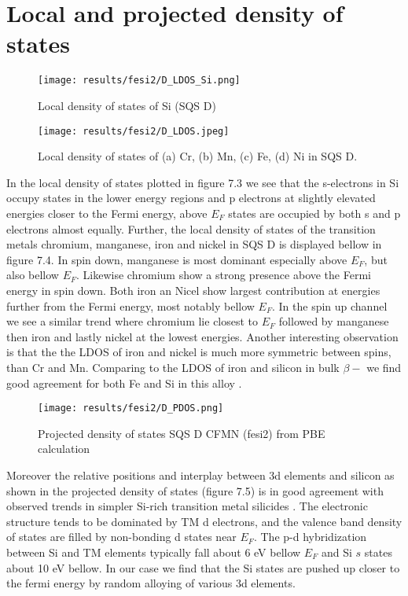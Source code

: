 \section{Local and projected density of states}
  
\begin{figure}[H]
	\centering
	\texttt{[image: results/fesi2/D\_LDOS\_Si.png]}
	\caption{Local density of states of Si (SQS D)}
\end{figure} 

\begin{figure}[H]
	\centering
	\texttt{[image: results/fesi2/D\_LDOS.jpeg]}
	\caption{Local density of states of (a) Cr, (b) Mn, (c) Fe, (d) Ni in SQS D.}
\end{figure}   
  
In the local density of states plotted in figure 7.3 we see that the s-electrons in Si occupy states in the lower energy regions and p electrons at slightly elevated energies closer to the Fermi energy, above $E_F$ states are occupied by both s and p electrons almost equally. Further, the local density of states of the transition metals chromium, manganese, iron and nickel in SQS D is displayed bellow in figure 7.4. In spin down, manganese is most dominant especially above $E_F$, but also bellow $E_F$. Likewise chromium show a strong presence above the Fermi energy in spin down. Both iron an Nicel show largest contribution at energies further from the Fermi energy, most notably bellow $E_F$. In the spin up channel we see a similar trend where chromium lie closest to $E_F$ followed by manganese then iron and lastly nickel at the lowest energies. Another interesting observation is that the the LDOS of iron and nickel is much more symmetric between spins, than Cr and Mn. Comparing to the LDOS of iron and silicon in bulk $\beta-$  \cite{doi:10.1063/1.346415} we find good agreement for both Fe and Si in this alloy .

\begin{figure}[H]
	\centering
	\texttt{[image: results/fesi2/D\_PDOS.png]}
	\caption{Projected density of states SQS D CFMN (fesi2) from PBE calculation}
\end{figure} 

Moreover the relative positions and interplay between 3d elements and silicon as shown in the projected density of states (figure 7.5) is in good agreement with observed trends in simpler Si-rich transition metal silicides \cite{lange1997electronic}. The electronic structure tends to be dominated by TM d electrons, and the valence band density of states are filled by non-bonding d states near $E_F$. The p-d hybridization between Si and TM elements typically fall about 6 eV bellow $E_F$ and Si $s$ states about 10 eV bellow. In our case we find that the Si states are pushed up closer to the fermi energy by random alloying of various 3d elements.    

